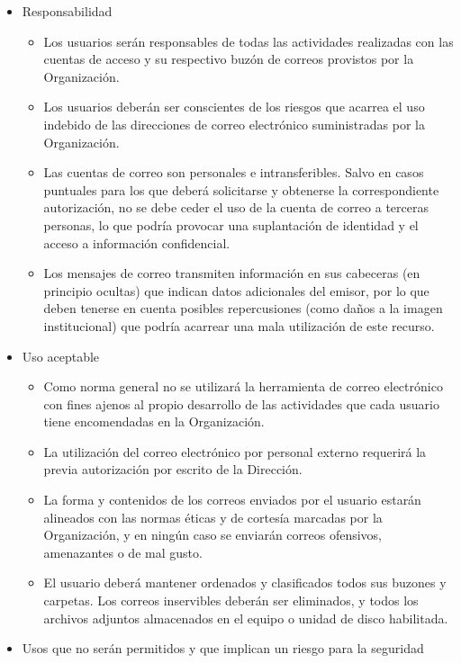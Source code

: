 \begin{enumerate}[label=\alph*)]
\begin{itemize}
    \item Responsabilidad
    \begin{itemize}
        \item Los usuarios serán responsables de todas las actividades realizadas con las cuentas de acceso y su respectivo buzón de correos provistos por la Organización.
        \item Los usuarios deberán ser conscientes de los riesgos que acarrea el uso indebido de las direcciones de correo electrónico suministradas por la Organización.
        \item Las cuentas de correo son personales e intransferibles. Salvo en casos puntuales para los que deberá solicitarse y obtenerse la correspondiente autorización, no se debe ceder el uso de la cuenta de correo a terceras personas, lo que podría provocar una suplantación de identidad y el acceso a información confidencial.
        \item Los mensajes de correo transmiten información en sus cabeceras (en principio ocultas) que indican datos adicionales del emisor, por lo que deben tenerse en cuenta posibles repercusiones (como daños a la imagen institucional) que podría acarrear una mala utilización de este recurso.
    \end{itemize}
    \item Uso aceptable
    \begin{itemize}
        \item Como norma general no se utilizará la herramienta de correo electrónico con fines ajenos al propio desarrollo de las actividades que cada usuario tiene encomendadas en la Organización.
        \item La utilización del correo electrónico por personal externo requerirá la previa autorización por escrito de la Dirección.
        \item La forma y contenidos de los correos enviados por el usuario estarán alineados con las normas éticas y de cortesía marcadas por la Organización, y en ningún caso se enviarán correos ofensivos, amenazantes o de mal gusto.
        \item El usuario deberá mantener ordenados y clasificados todos sus buzones y carpetas. Los correos inservibles deberán ser eliminados, y todos los archivos adjuntos almacenados en el equipo o unidad de disco habilitada.
    \end{itemize}
    \item Usos que no serán permitidos y que implican un riesgo para la seguridad

\end{itemize}
\end{enumerate}

